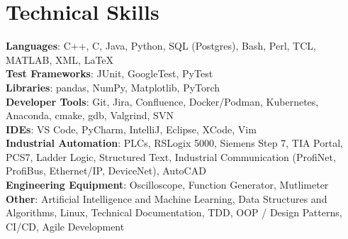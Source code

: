 \documentclass[letterpaper,11pt]{article}
\begin{document}
%
\section{Technical Skills}
 \begin{itemize}[leftmargin=0.15in, label={}]
    \small{\item{
     \textbf{Languages}{: C++, C, Java, Python, SQL (Postgres), Bash, Perl, TCL, MATLAB, XML, \LaTeX} \\
     \textbf{Test Frameworks}{: JUnit, GoogleTest, PyTest} \\
     \textbf{Libraries}{: pandas, NumPy, Matplotlib, PyTorch}\\
     \textbf{Developer Tools}{: Git, Jira, Confluence, Docker/Podman, Kubernetes, Anaconda, cmake, gdb, Valgrind,  SVN} \\
     \textbf{IDEs}{: VS Code, PyCharm, IntelliJ, Eclipse, XCode, Vim}\\
     \textbf{Industrial Automation}{: PLCs, RSLogix 5000, Siemens Step 7, TIA Portal, PCS7, Ladder Logic, Structured Text,  Industrial Communication (ProfiNet, ProfiBus, Ethernet/IP, DeviceNet), AutoCAD}\\
     \textbf{Engineering Equipment}{: Oscilloscope, Function Generator, Mutlimeter}\\
     \textbf{Other}{: Artificial Intelligence and Machine Learning, Data Structures and Algorithms, Linux, Technical Documentation, TDD, OOP / Design Patterns, CI/CD, Agile Development}
    }}
 \end{itemize}


\end{document}
